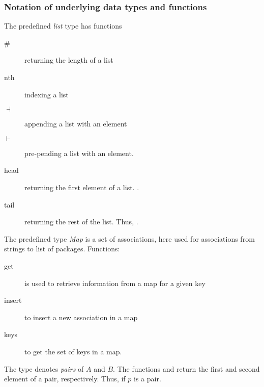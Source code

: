 \documentclass[handout]
{beamer}
\begin{document}
\begin{frame}
\frametitle{Notation of underlying data types and functions}
The predefined \emph{list} type has functions
\begin{description}
\item[{\#}] returning the length of a list
\item[nth]  indexing a list 
\item[{$\dashv$}] appending a list with an element
\item[{$\vdash$}] pre-pending a list with an element.
\item[head] returning the first element of a list. .
\item[tail] returning the rest of the list. Thus, .
\end{description}
The predefined type \emph{Map} is a set of associations, here used
for associations
 from strings to list of packages.  Functions:
\begin{description}
\item[get]
is used to
retrieve information from a map for a given key
\item[{insert}] to
insert a new association in a map
\item[{keys}] to get the set of keys
in a map.
\end{description}
The type \blue{$[A,B]$} denotes \emph{pairs} of $A$ and $B$. The
functions  and  return the first and
second element of a pair, respectively. Thus, 
if $p$ is a pair.
\end{frame}
\end{document}
